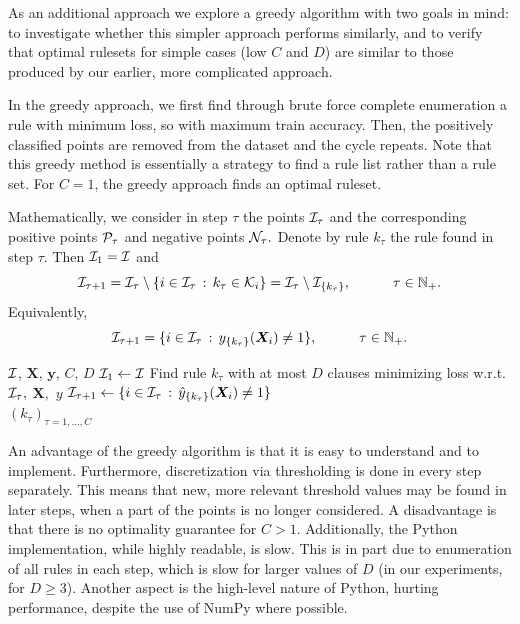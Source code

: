 As an additional approach we explore a greedy algorithm with two goals in mind:
to investigate whether this simpler approach performs similarly,
and to verify that optimal rulesets for simple cases (low $C$ and $D$)
are similar to those produced by our earlier, more complicated approach.

In the greedy approach, we first find through brute force complete enumeration a rule with minimum \zo loss,
so with maximum train accuracy.
Then, the positively classified points are removed from the dataset and the cycle repeats.
Note that this greedy method is essentially a strategy to find a rule list rather than a rule set.
For $C=1$, the greedy approach finds an optimal ruleset.

Mathematically, we consider in step $\tau$ the points $\I_\tau$ and the corresponding positive points $\P_\tau$ and negative points $\N_\tau.$
Denote by rule $k_\tau$ the rule found in step $\tau$.
Then $\I_1 = \I$ and
\[\I_{\tau + 1} = \I_\tau \setminus \{i \in \I_\tau \fw k_\tau \in \K_{i}\} = \I_\tau \setminus \I_{\{k_\tau\}}, \tquad \tau \in \mathbb{N}_+.\]
Equivalently,
\[\I_{\tau + 1} = \{i \in \I_\tau \fw y_{\{k_\tau\}}(\bm{X}_i) \neq 1\}, \tquad \tau \in \mathbb{N}_+.\]

\begin{algorithm}[h!]
\caption{Greedy Ruleset Selection}
\label{alg:greedy}
\begin{algorithmic}[1]
\Require $\I$, $\bm{X}$, $\bm{y}$, $C$, $D$
\State $\I_1 \gets \I$
    \State Find rule $k_\tau$ with at most $D$ clauses minimizing \zo loss w.r.t. $\I_\tau,$ $\bm{X},$ $y$
    \State $\I_{\tau+1} \gets \{i \in \I_{\tau} \fw \hat{y}_{\{k_\tau\}}(\bm{X}_i) \neq 1\}$
\EndFor \\
\Return $(k_\tau)_{\tau=1,\dots,C}$
\end{algorithmic}
\end{algorithm}

An advantage of the greedy algorithm is that it is easy to understand and to implement.
Furthermore, discretization via thresholding is done in every step separately.
This means that new, more relevant threshold values may be found in later steps,
when a part of the points is no longer considered.
A disadvantage is that there is no optimality guarantee for $C>1$.
Additionally, the Python implementation, while highly readable, is slow.
This is in part due to enumeration of all rules in each step, which is slow for larger values of $D$
(in our experiments, for $D\geq 3$).
Another aspect is the high-level nature of Python, hurting performance, despite the use of NumPy where possible.

